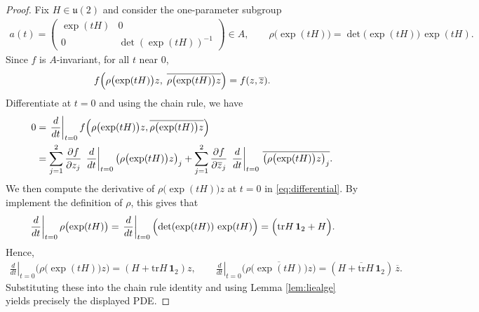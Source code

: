 \documentclass[11pt]{amsart}
\theoremstyle{definition}
\theoremstyle{plain}
\theoremstyle{conclusion}
\begin{document}
\begin{proof}
Fix $H\in\mathfrak{u}(2)$ and consider the one-parameter subgroup\begin{align*}
a(t)=\begin{pmatrix}\exp(tH)&0\\[2pt]0&\det(\exp(tH))^{-1}\end{pmatrix}\in A,\qquad\rho\bigl(\exp(tH)\bigr)=\det \bigl(\exp(tH)\bigr)\,\exp(tH).
\end{align*} Since $f$ is $A$-invariant, for all $t$ near $0$,\begin{align*}
f\Bigl(\rho\bigl(\exp(tH)\bigr)z,\;\overline{\rho\bigl(\exp(tH)\bigr)z}\Bigr)=f(z,\overline{z}).
\end{align*}Differentiate at $t=0$ and using the chain rule, we have 
\begin{align}
\nonumber
0 &= \left.\frac{d}{dt} \right\vert_{t=0} f\Bigl(\rho\bigl(\exp(tH)\bigr)z,\overline{\rho\bigl(\exp(tH)\bigr)z}\Bigr)\\
&=\sum_{j=1}^2 \frac{\partial f}{\partial z_j}\,\left.\frac{d}{dt}\right\vert_{t=0}\bigl(\rho\bigl(\exp(tH)\bigr)z\bigr)_j+\sum_{j=1}^2 \frac{\partial f}{\partial \overline{z}_j}\,\left.\frac{d}{dt}\right\vert_{t=0}\,\overline{\bigl(\rho\bigl(\exp(tH)\bigr)z\bigr)_j}. \label{eq:differential}
\end{align} We then compute the derivative of $\rho\bigl(\exp(tH)\bigr)z$ at $t=0$ in \eqref{eq:differential}. By implement the definition of $\rho$, this gives that\begin{align*}
\left.\frac{d}{dt}\right\vert_{t=0}\rho\bigl(\exp(tH)\bigr)= \left.\frac{d}{dt}\right\vert_{t=0}\Bigl(\det(\exp(tH))\,\exp(tH)\Bigr)=\Bigl(\mathrm{tr}H\,\mathbf{1}_2+H\Bigr).
\end{align*}Hence, \begin{align*}
\left.\frac{d}{dt}\right\vert_{t=0}\bigl(\rho\bigl(\exp(tH)\bigr)z\bigr)=(H+\mathrm{tr}H\,\mathbf{1}_2)z,\qquad \left.\frac{d}{dt}\right\vert_{t=0}\overline{\bigl(\rho\bigl(\exp(tH)\bigr)z\bigr)}=(\overline{H+\mathrm{tr}H\,\mathbf{1}_2})\,\overline{z}.
\end{align*}Substituting these into the chain rule identity and using Lemma \ref{lem:liealge} yields precisely the displayed PDE.
\end{proof}
\end{document}
